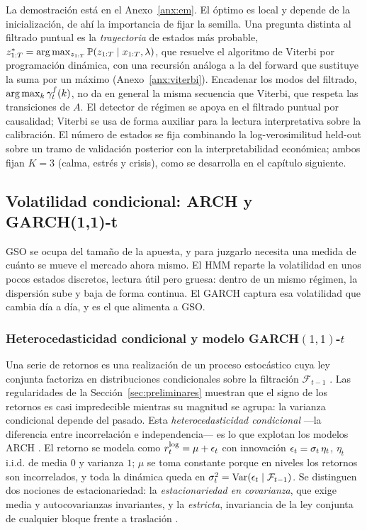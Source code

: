 La demostración está en el Anexo~\ref{anx:em}. El óptimo es local y depende de la inicialización, de ahí la importancia de fijar la semilla. Una pregunta distinta al filtrado puntual es la \emph{trayectoria} de estados más probable, $z_{1:T}^{\ast} = \arg\max_{z_{1:T}} \mathbb{P}(z_{1:T} \mid x_{1:T}, \lambda)$, que resuelve el algoritmo de Viterbi por programación dinámica, con una recursión análoga a la del forward que sustituye la suma por un máximo \cite{viterbi1967} (Anexo~\ref{anx:viterbi}). Encadenar los modos del filtrado, $\arg\max_k \gamma^{f}_t(k)$, no da en general la misma secuencia que Viterbi, que respeta las transiciones de $A$. El detector de régimen se apoya en el filtrado puntual por causalidad; Viterbi se usa de forma auxiliar para la lectura interpretativa sobre la calibración. El número de estados se fija combinando la log-verosimilitud held-out sobre un tramo de validación posterior \cite{rabiner1989} con la interpretabilidad económica; ambos fijan $K = 3$ (calma, estrés y crisis), como se desarrolla en el capítulo siguiente.

\subsection{Volatilidad condicional: ARCH y GARCH(1,1)-t}
\label{sec:garch}

GSO se ocupa del tamaño de la apuesta, y para juzgarlo necesita una medida de cuánto se mueve el mercado ahora mismo. El HMM reparte la volatilidad en unos pocos estados discretos, lectura útil pero gruesa: dentro de un mismo régimen, la dispersión sube y baja de forma continua. El GARCH captura esa volatilidad que cambia día a día, y es el que alimenta a GSO.

\subsubsection{Heterocedasticidad condicional y modelo GARCH$(1,1)$-$t$}
\label{sec:garch-intro}
\label{sec:garch-arch}
\label{sec:garch-t}

Una serie de retornos es una realización de un proceso estocástico cuya ley conjunta factoriza en distribuciones condicionales sobre la filtración $\mathcal{F}_{t-1}$ \cite{hamilton1994, tsay2010}. Las regularidades de la Sección~\ref{sec:preliminares} muestran que el signo de los retornos es casi impredecible mientras su magnitud se agrupa: la varianza condicional depende del pasado. Esta \emph{heterocedasticidad condicional} —la diferencia entre incorrelación e independencia— es lo que explotan los modelos ARCH \cite{cont2001}. El retorno se modela como $r_t^{\log} = \mu + \epsilon_t$ con innovación $\epsilon_t = \sigma_t\, \eta_t$, $\eta_t$ i.i.d. de media $0$ y varianza $1$; $\mu$ se toma constante porque en niveles los retornos son incorrelados, y toda la dinámica queda en $\sigma_t^2 = \operatorname{Var}(\epsilon_t \mid \mathcal{F}_{t-1})$. Se distinguen dos nociones de estacionariedad: la \emph{estacionariedad en covarianza}, que exige media y autocovarianzas invariantes, y la \emph{estricta}, invariancia de la ley conjunta de cualquier bloque frente a traslación \cite{brockwell1991}.

